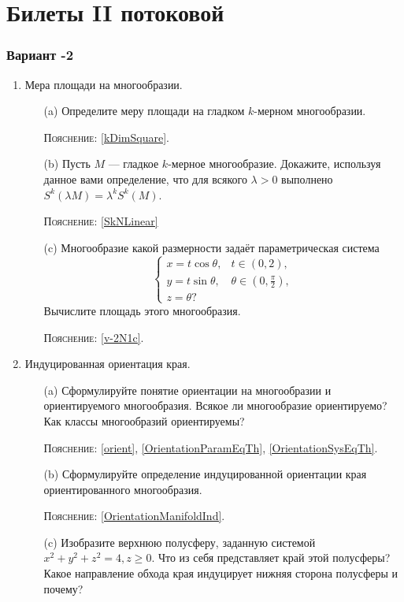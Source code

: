 \documentclass[a5paper]{article}
\theoremstyle{plain}
\theoremstyle{definition}
\numberwithin{through}{section}
\numberwithin{equation}{section}
\begin{document}
\newpage
\section{Билеты II потоковой}
\subsubsection{Вариант -2}

\begin{enumerate}
	\item 
	Мера площади на многообразии. 
	
	\begin{itemize}
		\item[(a)]
		Определите меру площади на гладком $k$-мерном многообразии.
		
		\textsc{Пояснение:}  \ref{kDimSquare}.
		
		\item[(b)]
		Пусть $M$ --- гладкое $k$-мерное многообразие. Докажите,
		используя данное вами определение, что для всякого 
		$\lambda > 0$ выполнено $S^k(\lambda M) = \lambda^k S^k(M)$.
		
		\textsc{Пояснение:} \ref{SkNLinear}
		
		\item[(c)]
		Многообразие какой размерности задаёт параметрическая система
		\begin{equation*}
			\begin{cases}
			x = t\cos \theta, & t \in (0, 2), \\
			y = t\sin \theta, & \theta \in (0, \frac{\pi}{2}), \\
			z = \theta ?
			\end{cases}
		\end{equation*}
		Вычислите площадь этого многообразия.
		
		\textsc{Пояснение:} \ref{v-2N1c}.
		
	\end{itemize}

	\item
	Индуцированная ориентация края.
	
	\begin{itemize}
		\item[(a)]
		Сформулируйте понятие ориентации на многообразии и
		ориентируемого многообразия. Всякое ли многообразие
		ориентируемо? Как классы многообразий ориентируемы?
		
		\textsc{Пояснение:} \ref{orient}, \ref{OrientationParamEqTh}, \ref{OrientationSysEqTh}.
		
		\item[(b)]
		Сформулируйте определение индуцированной ориентации края
		ориентированного многообразия.
		
		\textsc{Пояснение:} \ref{OrientationManifoldInd}.
		
		\item[(c)]
		Изобразите верхнюю полусферу, заданную системой
		$x^2 + y^2 + z^2 = 4, z \geq 0$. Что из себя представляет край этой полусферы?
		Какое направление обхода края индуцирует нижняя сторона
		полусферы и почему?
	\end{itemize}
\end{enumerate}
\end{document}

